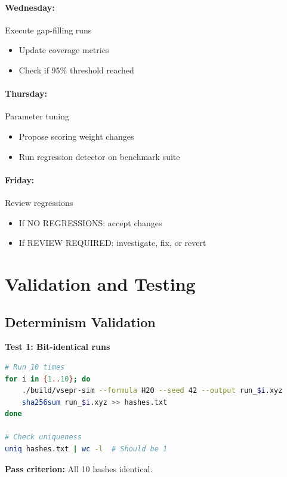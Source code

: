 \documentclass[11pt]{article}
\begin{document}
\paragraph{Wednesday:} Execute gap-filling runs
\begin{itemize}
\item Update coverage metrics
\item Check if 95\% threshold reached
\end{itemize}

\paragraph{Thursday:} Parameter tuning
\begin{itemize}
\item Propose scoring weight changes
\item Run regression detector on benchmark suite
\end{itemize}

\paragraph{Friday:} Review regressions
\begin{itemize}
\item If NO REGRESSIONS: accept changes
\item If REVIEW REQUIRED: investigate, fix, or revert
\end{itemize}

\section{Validation and Testing}

\subsection{Determinism Validation}

\textbf{Test 1: Bit-identical runs}

\begin{lstlisting}[language=bash]
# Run 10 times
for i in {1..10}; do
    ./build/vsepr-sim --formula H2O --seed 42 --output run_$i.xyz
    sha256sum run_$i.xyz >> hashes.txt
done

# Check uniqueness
uniq hashes.txt | wc -l  # Should be 1
\end{lstlisting}

\textbf{Pass criterion:} All 10 hashes identical.
\end{document}
